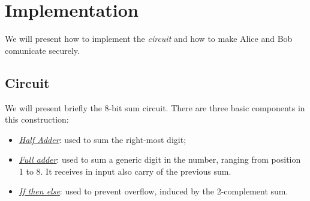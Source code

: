 \documentclass[12pt]{article}
\begin{document}
\section{Implementation}
We will present how to implement the \textit{circuit} and how to make Alice and Bob comunicate securely.
\subsection{Circuit}
We will present briefly the 8-bit sum circuit. There are three basic components in this construction:
\begin{itemize}
    \item \textit{\hyperref[half]{Half Adder}}: used to sum the right-most digit;
    \item \textit{\hyperref[full]{Full adder}}:  used to sum a generic digit in the number, ranging from position 1 to 8. It receives in input also carry of the previous sum.
    \item \textit{\hyperref[overflow]{If then else}}: used to prevent overflow, induced by the 2-complement sum.
\end{itemize}
\end{document}
